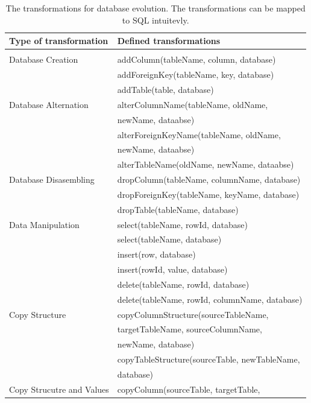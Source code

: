 \documentclass[runningheads]{comsis}
\begin{document}
\begin{table}
\caption{The transformations for database evolution. The transformations can be mapped to SQL intuitevly.}
	\label{tab:db-basic-evolution}
\centering
\setlength\tabcolsep{0.5em}
	\begin{tabular}{ll}
	\hline
	Type of transformation & Defined transformations \\
	\hline
	\\[-2ex] Database Creation
	& addColumn(tableName, column, database) \\
	& addForeignKey(tableName, key, database) \\
	& addTable(table, database)\\
	Database Alternation
	& alterColumnName(tableName, oldName, \\ & \hspace{0.5in}newName, dataabse) \\
	& alterForeignKeyName(tableName, oldName, \\ & \hspace{0.5in}newName, dataabse) \\
	& alterTableName(oldName, newName, dataabse) \\
	Database Disasembling
	& dropColumn(tableName, columnName, database) \\
	& dropForeignKey(tableName, keyName, database) \\
	& dropTable(tableName, database) \\
	Data Manipulation
	& select(tableName, rowId, database) \\
	& select(tableName, database) \\
	& insert(row, database) \\
	& insert(rowId, value, database) \\
	& delete(tableName, rowId, database) \\
	& delete(tableName, rowId, columnName, database) \\
	Copy Structure
	& copyColumnStructure(sourceTableName,\\ &  \hspace{0.5in} targetTableName,  sourceColumnName, \\ &  \hspace{0.5in} newName, database) \\
	& copyTableStructure(sourceTable, newTableName, \\ &  \hspace{0.5in} database) \\
	Copy Strucutre and Values
	& copyColumn(sourceTable, targetTable, \\

\end{tabular}
\end{table}
\end{document}
